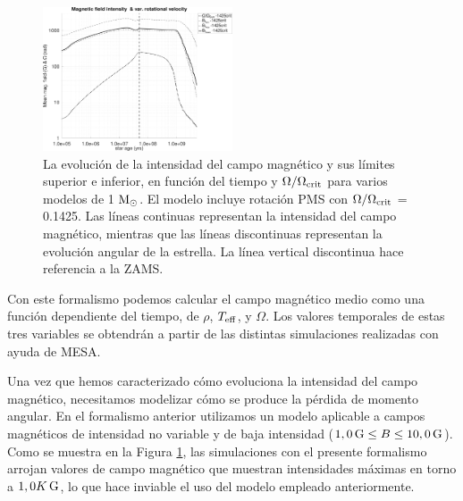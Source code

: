 \begin{figure}
	\centering
	\includegraphics[width=0.5\textwidth]{img/paper2/mag_field_limits_var_vel_g3.pdf}
	\caption{La evolución de la intensidad del campo magnético y sus límites superior e inferior, en función del tiempo y $\Omega / \Omega_{\mathrm{crit}}$ para varios modelos de 1 $\mathrm{M}_\odot$. El modelo incluye rotación PMS con $\Omega / \Omega_{\mathrm{crit}}$ = 0.1425. Las líneas continuas representan la intensidad del campo magnético, mientras que las líneas discontinuas representan la evolución angular de la estrella. La línea vertical discontinua hace referencia a la ZAMS.}
	\label{fig:mag_field_limits_var_vel_g3}
\end{figure}

Con este formalismo podemos calcular el campo magnético medio como una función dependiente del tiempo, de $\rho$, $T_{\mathrm{eff}}$, y $\Omega$. Los valores temporales de estas tres variables se obtendrán a partir de las distintas simulaciones realizadas con ayuda de MESA. \par

Una vez que hemos caracterizado cómo evoluciona la intensidad del campo magnético, necesitamos modelizar cómo se produce la pérdida de momento angular.  En el formalismo anterior utilizamos un modelo aplicable a campos magnéticos de intensidad no variable y de baja intensidad ($1,0\,\mathrm{G} \leq B \leq 10,0\,\mathrm{G}$). Como se muestra en la Figura \ref{fig:mag_field_limits_var_vel_g3}, las simulaciones con el presente formalismo arrojan valores de campo magnético que muestran intensidades máximas en torno a $1,0K\,\mathrm{G}$, lo que hace inviable el uso del modelo empleado anteriormente. \par


